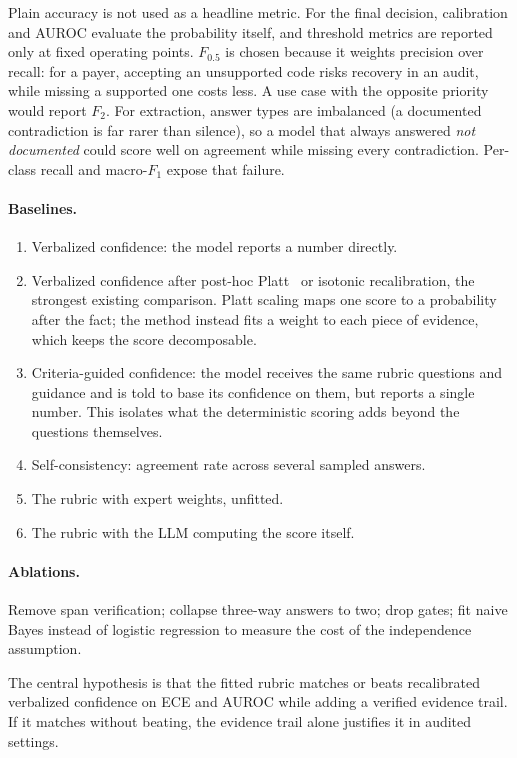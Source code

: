 \documentclass[10pt,letterpaper]{article}
\newcommand{\nd}{\textit{not documented}}
\begin{document}
Plain accuracy is not used as a headline metric. For the final decision, calibration and AUROC evaluate the probability itself, and threshold metrics are reported only at fixed operating points. $F_{0.5}$ is chosen because it weights precision over recall: for a payer, accepting an unsupported code risks recovery in an audit, while missing a supported one costs less. A use case with the opposite priority would report $F_2$. For extraction, answer types are imbalanced (a documented contradiction is far rarer than silence), so a model that always answered \nd{} could score well on agreement while missing every contradiction. Per-class recall and macro-$F_1$ expose that failure.

\paragraph{Baselines.}
\begin{enumerate}
  \item Verbalized confidence: the model reports a number directly.
  \item Verbalized confidence after post-hoc Platt~\cite{platt} or isotonic recalibration, the strongest existing comparison. Platt scaling maps one score to a probability after the fact; the method instead fits a weight to each piece of evidence, which keeps the score decomposable.
  \item Criteria-guided confidence: the model receives the same rubric questions and guidance and is told to base its confidence on them, but reports a single number. This isolates what the deterministic scoring adds beyond the questions themselves.
  \item Self-consistency: agreement rate across several sampled answers.
  \item The rubric with expert weights, unfitted.
  \item The rubric with the LLM computing the score itself.
\end{enumerate}

\paragraph{Ablations.} Remove span verification; collapse three-way answers to two; drop gates; fit naive Bayes instead of logistic regression to measure the cost of the independence assumption.

The central hypothesis is that the fitted rubric matches or beats recalibrated verbalized confidence on ECE and AUROC while adding a verified evidence trail. If it matches without beating, the evidence trail alone justifies it in audited settings.
\end{document}
